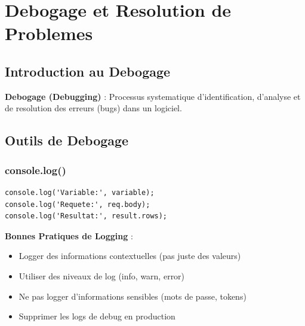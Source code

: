 \documentclass[a4paper,12pt]{book}
\begin{document}
\chapter{Debogage et Resolution de Problemes}

\section{Introduction au Debogage}

\begin{definitionbox}
    \textbf{Debogage (Debugging)} : Processus systematique d'identification, d'analyse et de resolution des erreurs (bugs) dans un logiciel.
\end{definitionbox}

\section{Outils de Debogage}

\subsection{console.log()}

\begin{lstlisting}[style=javascript, caption=Debogage avec console.log]
console.log('Variable:', variable);
console.log('Requete:', req.body);
console.log('Resultat:', result.rows);
\end{lstlisting}

\begin{bestpracticebox}
    \textbf{Bonnes Pratiques de Logging} :
    \begin{itemize}
        \item Logger des informations contextuelles (pas juste des valeurs)
        \item Utiliser des niveaux de log (info, warn, error)
        \item Ne pas logger d'informations sensibles (mots de passe, tokens)
        \item Supprimer les logs de debug en production
    \end{itemize}
\end{bestpracticebox}

\end{document}
